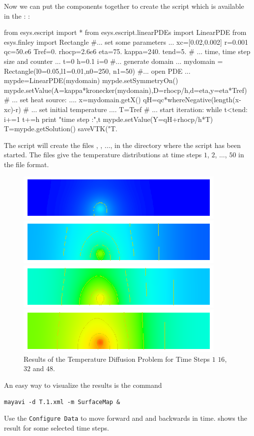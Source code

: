 Now we can put the components together to create the script  which is available in the \ExampleDirectory:
:
\begin{python}
from esys.escript import *
from esys.escript.linearPDEs import LinearPDE
from esys.finley import Rectangle
#... set some parameters ...
xc=[0.02,0.002]
r=0.001
qc=50.e6
Tref=0.
rhocp=2.6e6
eta=75.
kappa=240.
tend=5.
# ... time, time step size and counter ...
t=0
h=0.1
i=0
#... generate domain ...
mydomain = Rectangle(l0=0.05,l1=0.01,n0=250, n1=50)
#... open PDE ...
mypde=LinearPDE(mydomain)
mypde.setSymmetryOn()
mypde.setValue(A=kappa*kronecker(mydomain),D=rhocp/h,d=eta,y=eta*Tref)
# ... set heat source: ....
x=mydomain.getX()
qH=qc*whereNegative(length(x-xc)-r)
# ... set initial temperature ....
T=Tref
# ... start iteration:
while t<tend:
      i+=1
      t+=h
      print "time step :",t
      mypde.setValue(Y=qH+rhocp/h*T)
      T=mypde.getSolution()
      saveVTK("T.%
\end{python}
The script will create the files ,
 , $\ldots$,  in the directory where the script has been started. The files give the 
temperature distributions at time steps $1$, $2$, $\ldots$, $50$ in the \VTK file format. 

\begin{figure}
\centerline{\includegraphics[width=\figwidth]{DiffusionRes1}}
\centerline{\includegraphics[width=\figwidth]{DiffusionRes16}}
\centerline{\includegraphics[width=\figwidth]{DiffusionRes32}}
\centerline{\includegraphics[width=\figwidth]{DiffusionRes48}}
\caption{Results of the Temperature Diffusion Problem for Time Steps $1$ $16$, $32$ and $48$.}
\label{DIFFUSION FIG 2}
\end{figure}
An easy way to visualize the results is the command
\begin{verbatim}
mayavi -d T.1.xml -m SurfaceMap &
\end{verbatim}
Use the \texttt{Configure Data}
to move forward and and backwards in time. 
 shows the result for some selected time steps.
